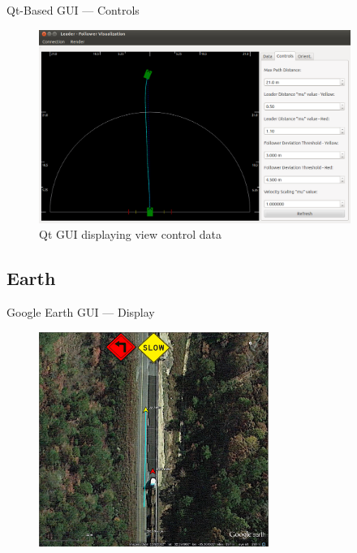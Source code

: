 \documentclass{beamer}
\begin{document}
    \begin{frame}{Qt-Based GUI --- Controls}
      \begin{figure}[ht] \centering
        \includegraphics[width=4in] {../graphics/final_design_opts.png}
        \caption{Qt GUI displaying view control data} \label{fig:qt_controls}
      \end{figure}
    \end{frame}


  \subsection{Earth}

    \begin{frame}{Google Earth GUI --- Display}
      \begin{figure}
        \includegraphics[width=7.5cm]{../graphics/earth_display.png}
      \end{figure}
    \end{frame}
\end{document}
